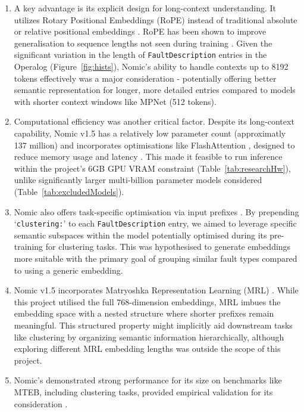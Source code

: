 \documentclass[10pt,oneside]{report}
\begin{document}
\begin{enumerate}
    \item A key advantage is its explicit design for long-context understanding. It utilizes Rotary Positional Embeddings (RoPE) \cite{su2024roformer} instead of traditional absolute or relative positional embeddings \cite{vaswani2017attention}. RoPE has been shown to improve generalisation to sequence lengths not seen during training \cite{su2024roformer}. Given the significant variation in the length of \texttt{FaultDescription} entries in the Operalog (Figure~\ref{fig:hists}), Nomic's ability to handle contexts up to 8192 tokens effectively was a major consideration - potentially offering better semantic representation for longer, more detailed entries compared to models with shorter context windows like MPNet (512 tokens).

    \item Computational efficiency was another critical factor. Despite its long-context capability, Nomic v1.5 has a relatively low parameter count (approximatly 137 million) and incorporates optimisations like FlashAttention \cite{dao2022flashattention}, designed to reduce memory usage and latency \cite{nussbaum2024nomic}. This made it feasible to run inference within the project's 6GB GPU VRAM constraint (Table~\ref{tab:researchHw}), unlike significantly larger multi-billion parameter models considered (Table~\ref{tab:excludedModels}).

    \item Nomic also offers task-specific optimisation via input prefixes \cite{nussbaum2024nomic}. By prepending `\texttt{clustering:}' to each \texttt{FaultDescription} entry, we aimed to leverage specific semantic subspaces within the model potentially optimised during its pre-training for clustering tasks. This was hypothesised to generate embeddings more suitable with the primary goal of grouping similar fault types compared to using a generic embedding.

    \item Nomic v1.5 incorporates Matryoshka Representation Learning (MRL) \cite{kusupati2022matryoshka, nussbaum2024nomic1.5}. While this project utilised the full 768-dimension embeddings, MRL imbues the embedding space with a nested structure where shorter prefixes remain meaningful. This structured property might implicitly aid downstream tasks like clustering by organizing semantic information hierarchically, although exploring different MRL embedding lengths was outside the scope of this project.

    \item Nomic's demonstrated strong performance for its size on benchmarks like MTEB, including clustering tasks, provided empirical validation for its consideration \cite{muennighoff2022mteb, nussbaum2024nomicelo}. 
\end{enumerate}
\end{document}
